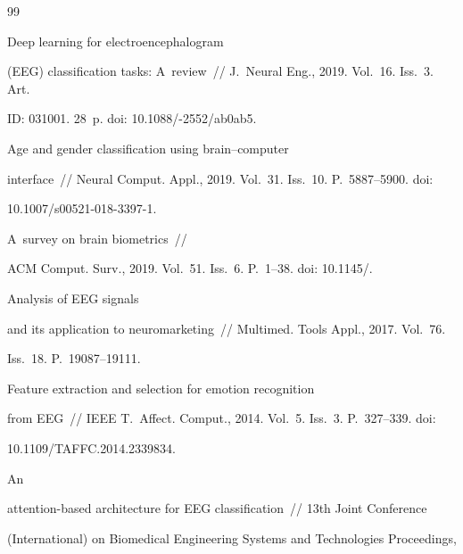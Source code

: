 {\small\frenchspacing

{%


\begin{thebibliography}{99}


   Deep learning for electroencephalogram 

(EEG) classification tasks: A~review~/\!\!/ J.~Neural Eng., 2019. Vol.~16. Iss.~3. Art. 

ID: 031001. 28~p. doi: 10.1088\!/-2552\!/\!ab0ab5.


   Age and gender classification using brain--computer 

interface~/\!\!/ Neural Comput. Appl., 2019. Vol.~31. Iss.~10. P.~5887--5900. doi: 

10.1007\!/\!s00521-018-3397-1.


   A~survey on brain biometrics~/\!\!/ 

ACM Comput. Surv., 2019. Vol.~51. Iss.~6. P.~1--38. doi: 10.1145\!/.


   Analysis of EEG signals 

and its application to neuromarketing~/\!\!/ Multimed. Tools Appl., 2017. Vol.~76. 

Iss.~18. P.~19087--19111.


   Feature extraction and selection for emotion recognition 

from EEG~/\!\!/ IEEE T.~Affect. Comput., 2014. Vol.~5. Iss.~3. P.~327--339. doi: 

10.1109\!/\!TAFFC.2014.2339834.


   An 

attention-based architecture for EEG classification~/\!\!/ 13th Joint Conference 

(International) on Biomedical Engineering Systems and Technologies Proceedings, 


\end{thebibliography}}}

